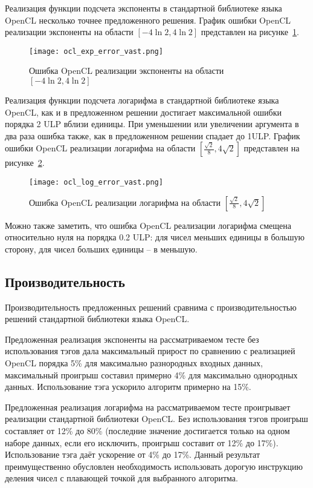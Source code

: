 Реализация функции подсчета экспоненты в стандартной библиотеке языка OpenCL несколько точнее предложенного решения.
График ошибки OpenCL реализации экспоненты на области $[-4\ln{2}, 4\ln{2}]$ представлен на рисунке~\ref{plot:ocl_exp:small}.


\begin{figure}[hbt]
    \centering
    \texttt{[image: ocl\_exp\_error\_vast.png]}
    \caption{Ошибка OpenCL реализации экспоненты на области $[-4\ln{2}, 4\ln{2}]$}
    \label{plot:ocl_exp:small}
\end{figure}

Реализация функции подсчета логарифма в стандартной библиотеке языка OpenCL, как и в предложенном решении достигает максимальной ошибки порядка 2 ULP вблизи единицы.
При уменьшении или увеличении аргумента в два раза ошибка также, как в предложенном решении спадает до 1ULP.
График ошибки OpenCL реализации логарифма на области $[\frac{\sqrt{2}}{8}, 4\sqrt{2}]$ представлен на рисунке~\ref{plot:ocl_log:small}.


\begin{figure}[hbt]
    \centering
    \texttt{[image: ocl\_log\_error\_vast.png]}
    \caption{Ошибка OpenCL реализации логарифма на области $[\frac{\sqrt{2}}{8}, 4\sqrt{2}]$}
    \label{plot:ocl_log:small}
\end{figure}

Можно также заметить, что ошибка OpenCL реализации логарифма смещена относительно нуля на порядка 0.2 ULP: для чисел меньших единицы в большую сторону, для чисел больших единицы -- в меньшую.

\subsection{Производительность}

Производительность предложенных решений сравнима с производительностью решений стандартной библиотеки языка OpenCL.

Предложенная реализация экспоненты на рассматриваемом тесте без использования тэгов дала максимальный прирост по сравнению с реализацией OpenCL порядка 5\% для максимально разнородных входных данных, максимальный проигрыш составил примерно 4\% для максимально однородных данных.
Использование тэга ускорило алгоритм примерно на 15\%.

Предложенная реализация логарифма на рассматриваемом тесте проигрывает реализации стандартной библиотеки OpenCL.
Без использования тэгов проигрыш составляет от 12\% до 80\% (последние значение достигается только на одном наборе данных, если его исключить, проигрыш составит от 12\% до 17\%).
Использование тэга даёт ускорение от 4\% до 17\%.
Данный результат преимущественно обусловлен необходимость использовать дорогую инструкцию деления чисел с плавающей точкой для выбранного алгоритма.

